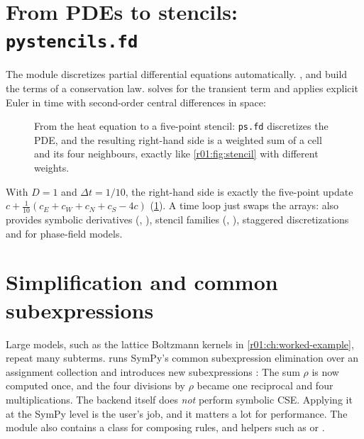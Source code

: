 \section{From PDEs to stencils: \texttt{pystencils.fd}}\label{r01:sec:fd}

The module  discretizes partial differential equations automatically.
,  and  build the terms of a
conservation law.  solves for the transient term
and applies explicit Euler in time with second-order central differences in space:

\begin{figure}[htbp]
  \centering
  
  \caption[From the heat equation to a five-point stencil]{From the heat equation to a five-point stencil: \texttt{ps.fd} discretizes the PDE, and the resulting right-hand side is a weighted sum of a cell and its four neighbours, exactly like \cref{r01:fig:stencil} with different weights.}
  \label{r01:fig:heat-stencil}
\end{figure}
With $D=1$ and $\Delta t=1/10$, the right-hand side is exactly the five-point update
$c + \tfrac{1}{10}(c_E+c_W+c_N+c_S-4c)$ (\cref{r01:fig:heat-stencil}). A time loop just swaps the arrays:
 also provides symbolic derivatives (, ), stencil
families (, ),
staggered discretizations and  for phase-field models.

\section{Simplification and common subexpressions}\label{r01:sec:simp}

Large models, such as the lattice Boltzmann kernels in \cref{r01:ch:worked-example}, repeat
many subterms.  runs SymPy's common subexpression
elimination over an assignment collection and introduces new subexpressions
:
The sum $\rho$ is now computed once, and the four divisions by $\rho$ became one
reciprocal  and four multiplications. The backend itself does \emph{not} perform symbolic CSE. Applying it at the SymPy level
is the user's job, and it matters a lot for performance. The  module also
contains a  class for composing rules, and helpers such as
 or .

